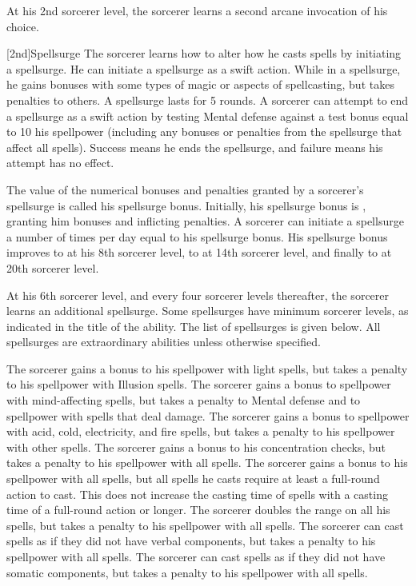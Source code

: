 At his 2nd sorcerer level, the sorcerer learns a second arcane invocation of his choice.

[2nd]{Spellsurge}
The sorcerer learns how to alter how he casts spells by initiating a spellsurge.
He can initiate a spellsurge as a swift action.
While in a spellsurge, he gains bonuses with some types of magic or aspects of spellcasting, but takes penalties to others.
A spellsurge lasts for 5 rounds.
A sorcerer can attempt to end a spellsurge as a swift action by testing Mental defense against a test bonus equal to 10 \add his spellpower (including any bonuses or penalties from the spellsurge that affect all spells).
Success means he ends the spellsurge, and failure means his attempt has no effect.

The value of the numerical bonuses and penalties granted by a sorcerer's spellsurge is called his spellsurge bonus.
Initially, his spellsurge bonus is , granting him  bonuses and inflicting  penalties.
A sorcerer can initiate a spellsurge a number of times per day equal to his spellsurge bonus.
His spellsurge bonus improves to  at his 8th sorcerer level, to  at 14th sorcerer level, and finally to  at 20th sorcerer level.

At his 6th sorcerer level, and every four sorcerer levels thereafter, the sorcerer learns an additional spellsurge.
Some spellsurges have minimum sorcerer levels, as indicated in the title of the ability.
The list of spellsurges is given below.
All spellsurges are extraordinary abilities unless otherwise specified.

The sorcerer gains a bonus to his spellpower with light spells, but takes a penalty to his spellpower with Illusion spells.
The sorcerer gains a bonus to spellpower with mind-affecting spells, but takes a penalty to Mental defense and to spellpower with spells that deal damage.
The sorcerer gains a bonus to spellpower with acid, cold, electricity, and fire spells, but takes a penalty to his spellpower with other spells.
The sorcerer gains a bonus to his concentration checks, but takes a penalty to his spellpower with all spells.
The sorcerer gains a bonus to his spellpower with all spells, but all spells he casts require at least a full-round action to cast.
This does not increase the casting time of spells with a casting time of a full-round action or longer.
The sorcerer doubles the range on all his spells, but takes a penalty to his spellpower with all spells.
The sorcerer can cast spells as if they did not have verbal components, but takes a penalty to his spellpower with all spells.
The sorcerer can cast spells as if they did not have somatic components, but takes a penalty to his spellpower with all spells.

